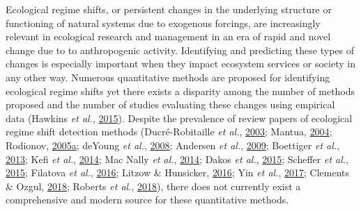 \documentclass[print]{nuthesis}
\begin{document}
Ecological regime shifts, or persistent changes in the underlying structure or functioning of natural systems due to exogenous forcings, are increasingly relevant in ecological research and management in an era of rapid and novel change due to to anthropogenic activity. Identifying and predicting these types of changes is especially important when they impact ecosystem services or society in any other way. Numerous quantitative methods are proposed for identifying ecological regime shifts yet there exists a disparity among the number of methods proposed and the number of studies evaluating these changes using empirical data (Hawkins \emph{et al.}, \protect\hyperlink{ref-hawkins2015ecosystems}{2015}). Despite the prevalence of review papers of ecological regime shift detection methods (Ducré-Robitaille \emph{et al.}, \protect\hyperlink{ref-ducre2003comparison}{2003}; Mantua, \protect\hyperlink{ref-mantua_methods_2004}{2004}; Rodionov, \protect\hyperlink{ref-rodionov_brief_2005}{2005}\protect\hyperlink{ref-rodionov_brief_2005}{a}; deYoung \emph{et al.}, \protect\hyperlink{ref-deyoung_regime_2008}{2008}; Andersen \emph{et al.}, \protect\hyperlink{ref-andersen_ecological_2009}{2009}; Boettiger \emph{et al.}, \protect\hyperlink{ref-boettiger_early_2013}{2013}; Kefi \emph{et al.}, \protect\hyperlink{ref-kefi2014early}{2014}; Mac Nally \emph{et al.}, \protect\hyperlink{ref-mac2014scrutiny}{2014}; Dakos \emph{et al.}, \protect\hyperlink{ref-dakos2015resilience}{2015}; Scheffer \emph{et al.}, \protect\hyperlink{ref-scheffer2015generic}{2015}; Filatova \emph{et al.}, \protect\hyperlink{ref-filatova2016regime}{2016}; Litzow \& Hunsicker, \protect\hyperlink{ref-litzow_early_2016}{2016}; Yin \emph{et al.}, \protect\hyperlink{ref-yin2017methods}{2017}; Clements \& Ozgul, \protect\hyperlink{ref-clements2018indicators}{2018}; Roberts \emph{et al.}, \protect\hyperlink{ref-roberts2018early}{2018}), there does not currently exist a comprehensive and modern source for these quantitative methods.
\end{document}
